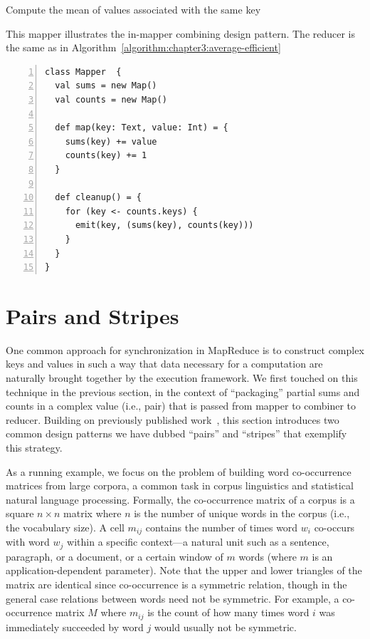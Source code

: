 \begin{algorithm}[t]
\caption{Compute the mean of values associated with the same key}
\label{algorithm:chapter3:average-more-efficient}
This mapper illustrates the in-mapper combining design pattern. The
reducer is the same as in
Algorithm~\ref{algorithm:chapter3:average-efficient}
\begin{small}
\begin{Verbatim}[numbers=left, xleftmargin=7.5mm]
class Mapper  {
  val sums = new Map()
  val counts = new Map()

  def map(key: Text, value: Int) = {
    sums(key) += value
    counts(key) += 1
  }

  def cleanup() = {
    for (key <- counts.keys) {
      emit(key, (sums(key), counts(key)))
    }
  }
}
\end{Verbatim}
\end{small}
\end{algorithm}

\section{Pairs and Stripes}
\label{chapter3:pairs-and-stripes}

One common approach for synchronization in MapReduce is to construct
complex keys and values in such a way that data necessary for a
computation are naturally brought together by the execution framework.
We first touched on this technique in the previous section, in the
context of ``packaging'' partial sums and counts in a complex value
(i.e., pair) that is passed from mapper to combiner to reducer.
Building on previously published
work~\cite{Dyer_etal_2008,Lin_EMNLP2008}, this section introduces two
common design patterns we have dubbed ``pairs'' and ``stripes'' that
exemplify this strategy.

As a running example, we focus on the problem of building word
co-occurrence matrices from large corpora, a common task in corpus
linguistics and statistical natural language processing.  Formally,
the co-occurrence matrix of a corpus is a square $n \times n$ matrix
where $n$ is the number of unique words in the corpus
(i.e., the vocabulary size).  A cell $m_{ij}$ contains the number of
times word $w_i$ co-occurs with word $w_j$ within a specific
context---a natural unit such as a sentence, paragraph, or a document,
or a certain window of $m$ words (where $m$ is an
application-dependent parameter).  Note that the upper and lower
triangles of the matrix are identical since co-occurrence is a
symmetric relation, though in the general case relations between words
need not be symmetric.  For example, a co-occurrence matrix $M$ where
$m_{ij}$ is the count of how many times word $i$ was immediately
succeeded by word $j$ would usually not be symmetric.

